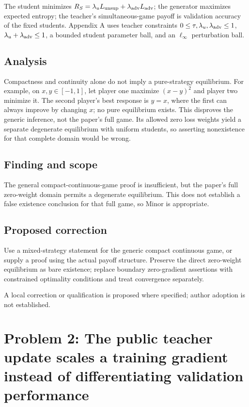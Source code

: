 \documentclass[11pt]{article}
\begin{document}
The student minimizes \(R_S=\lambda_u L_{\rm unsup}+\lambda_{\rm adv}L_{\rm adv}\); the generator maximizes expected entropy; the teacher’s simultaneous-game payoff is validation accuracy of the fixed students. Appendix A uses teacher constraints \(0\leq\tau,\lambda_u,\lambda_{\rm adv}\leq1\), \(\lambda_u+\lambda_{\rm adv}\leq1\), a bounded student parameter ball, and an \(\ell_\infty\) perturbation ball.

\subsection*{Analysis}

Compactness and continuity alone do not imply a pure-strategy equilibrium. For example, on \(x,y\in[-1,1]\), let player one maximize \((x-y)^2\) and player two minimize it. The second player's best response is \(y=x\), where the first can always improve by changing \(x\); no pure equilibrium exists. This disproves the generic inference, not the paper's full game. Its allowed zero loss weights yield a separate degenerate equilibrium with uniform students, so asserting nonexistence for that complete domain would be wrong.

\subsection*{Finding and scope}

The general compact-continuous-game proof is insufficient, but the paper's full zero-weight domain permits a degenerate equilibrium. This does not establish a false existence conclusion for that full game, so Minor is appropriate.

\subsection*{Proposed correction}

Use a mixed-strategy statement for the generic compact continuous game, or supply a proof using the actual payoff structure. Preserve the direct zero-weight equilibrium as bare existence; replace boundary zero-gradient assertions with constrained optimality conditions and treat convergence separately.

A local correction or qualification is proposed where specified; author adoption is not established.

\section*{Problem 2: The public teacher update scales a training gradient instead of differentiating validation performance}
\end{document}
